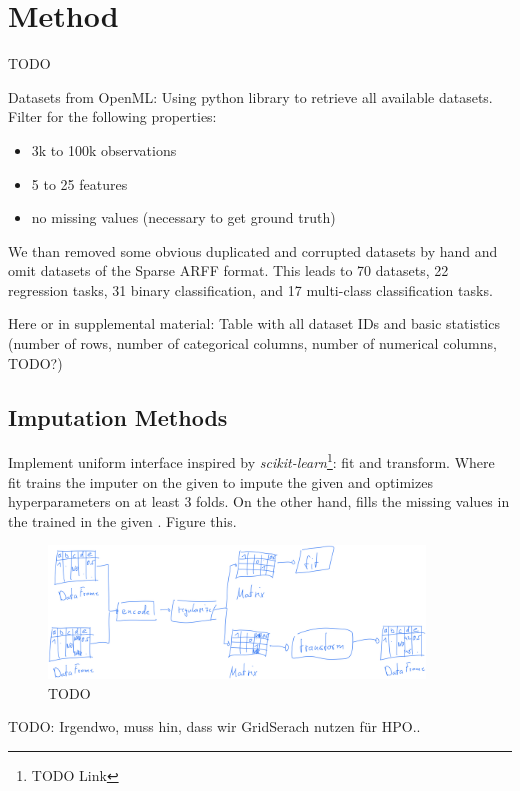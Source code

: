 

\section{Method}

TODO



Datasets from OpenML:
Using  python library to retrieve all available datasets. Filter for the following properties:
\begin{itemize}
	\item 3k to 100k observations
	\item 5 to 25 features
	\item no missing values (necessary to get ground truth)
\end{itemize}

We than removed some obvious duplicated and corrupted datasets by hand and omit datasets of the Sparse ARFF format. This leads to 70 datasets, 22 regression tasks, 31 binary classification, and 17 multi-class classification tasks.

Here or in supplemental material: Table with all dataset IDs and basic statistics (number of rows, number of categorical columns, number of numerical columns, TODO?)


\subsection{Imputation Methods}
%
Implement uniform interface inspired by \emph{scikit-learn}\footnote{TODO Link}: fit and transform. Where fit trains the imputer on the given  to impute the given   and optimizes hyperparameters on at least 3 folds. On the other hand,  fills the missing values in the trained  in the given . Figure \label{imputer_process} this.
%
\begin{figure}[h!]
	\centering
	\includegraphics[width=10cm]{figures/fit_process}
	\caption{TODO}
	\label{fig:imputer_process}
\end{figure}

TODO: Irgendwo, muss hin, dass wir GridSerach nutzen für HPO..

